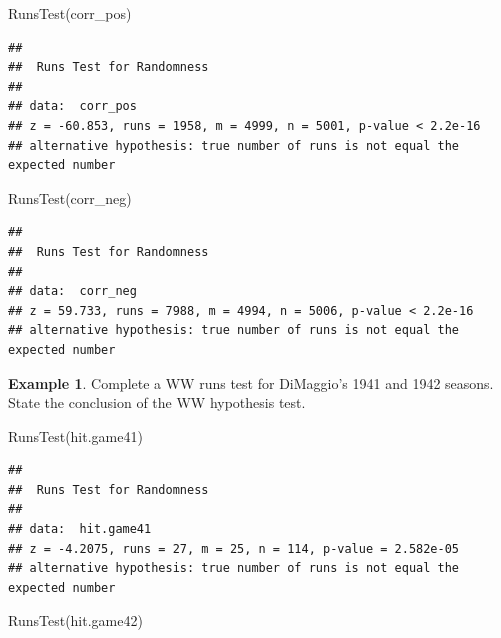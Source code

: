 \documentclass[
  11pt,
]{book}
\newenvironment{Shaded}{\begin{snugshade}}{\end{snugshade}}
\newcommand{\FunctionTok}[1]{\textcolor[rgb]{0.00,0.00,0.00}{#1}}
\newcommand{\NormalTok}[1]{#1}
\theoremstyle{definition}
\theoremstyle{definition}
\newtheorem{example}{Example}[chapter]
\theoremstyle{definition}
\theoremstyle{definition}
\theoremstyle{remark}
\begin{document}
\vfill

\begin{Shaded}
\begin{Highlighting}[]
\FunctionTok{RunsTest}\NormalTok{(corr\_pos)}
\end{Highlighting}
\end{Shaded}

\begin{verbatim}
## 
##  Runs Test for Randomness
## 
## data:  corr_pos
## z = -60.853, runs = 1958, m = 4999, n = 5001, p-value < 2.2e-16
## alternative hypothesis: true number of runs is not equal the expected number
\end{verbatim}

\vfill

\begin{Shaded}
\begin{Highlighting}[]
\FunctionTok{RunsTest}\NormalTok{(corr\_neg)}
\end{Highlighting}
\end{Shaded}

\begin{verbatim}
## 
##  Runs Test for Randomness
## 
## data:  corr_neg
## z = 59.733, runs = 7988, m = 4994, n = 5006, p-value < 2.2e-16
## alternative hypothesis: true number of runs is not equal the expected number
\end{verbatim}

\newpage

\begin{example}
Complete a WW runs test for DiMaggio's 1941 and 1942 seasons. State the conclusion of the WW hypothesis test.
\end{example}

\begin{Shaded}
\begin{Highlighting}[]
\FunctionTok{RunsTest}\NormalTok{(hit.game41)}
\end{Highlighting}
\end{Shaded}

\begin{verbatim}
## 
##  Runs Test for Randomness
## 
## data:  hit.game41
## z = -4.2075, runs = 27, m = 25, n = 114, p-value = 2.582e-05
## alternative hypothesis: true number of runs is not equal the expected number
\end{verbatim}

\vfill

\begin{Shaded}
\begin{Highlighting}[]
\FunctionTok{RunsTest}\NormalTok{(hit.game42)}
\end{Highlighting}
\end{Shaded}
\end{document}
